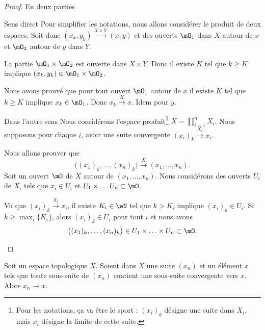 \begin{proof}
	En deux parties
	\begin{subproof}
		\item[Sens direct]
		Pour simplifier les notations, nous allons considérer le produit de deux espaces. Soit donc \( (x_k,y_k)\stackrel{X\times Y}{\longrightarrow}(x,y)\) et des ouverts \( \mO_1\) dans \( X\) autour de \( x\) et \( \mO_2\) autour de \( y\) dans \( Y\).

		La partie \( \mO_1\times \mO_2\) est ouverte dans \( X\times Y\). Donc il existe \( K\) tel que \( k\geq K\) implique \( (x_k,y_k)\in \mO_1\times \mO_2\).

		Nous avons prouvé que pour tout ouvert \( \mO_1\) autour de \( x\) il existe \( K\) tel que \( k\geq K\) implique \( x_k\in \mO_1\). Donc \( x_k\stackrel{X}{\longrightarrow}x\). Idem pour \( y\).

		\item[Dans l'autre sens]
		Nous considérons l'espace produit\footnote{Pour les notations, ça va être le sport : \( (x_i)_k\) désigne une suite dans \( X_i\), mais \( x_i\) désigne la limite de cette suite.} \( X=\prod_{i=1}^nX_i\). Nous supposons pour chaque \( i\), avoir une suite convergente \( (x_i)_k\stackrel{X_i}{\longrightarrow}x_i\).

		Nous allons prouver que
		\begin{equation}
			\big( (x_1)_k,\ldots, (x_n)_k \big)\stackrel{X}{\longrightarrow}(x_1,\ldots, x_n).
		\end{equation}
		Soit un ouvert \( \mO\) de \( X\) autour de \( (x_1,\ldots, x_n)\). Nous considérons des ouverts \( U_i\) de \( X_i\) tels que \( x_i\in U_i\) et \( U_1\times\ldots U_n\subset\mO\).

		Vu que \( (x_i)_k\stackrel{X_i}{\longrightarrow}x_i\), il existe \( K_i\in \eN\) tel que \( k>K_i\) implique \( (x_i)_k\in U_i\). Si \( k\geq \max_i\{ K_i \}\), alors \( (x_i)_k\in U_i\) pour tout \( i\) et nous avons
		\begin{equation}
			\big( (x_1)_k,\ldots,(x_n)_k \big)\in U_1\times\ldots\times U_n\subset \mO.
		\end{equation}
	\end{subproof}
\end{proof}

\begin{lemma}        \label{LEMooSJKMooKSiEGq}
	Soit un espace topologique \( X\). Soient dans \( X\) une suite \( (x_n)\) et un élément \( x\) tels que toute sous-suite de \( (x_n)\) contient une sous-suite convergente vers \( x\). Alors \( x_n\to x\).
\end{lemma}

